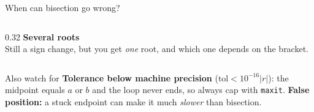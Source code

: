 \documentclass[aspectratio=169]{beamer}
\begin{document}
\begin{frame}{When can bisection go wrong?}
\begin{columns}[T]
\begin{column}{0.32\textwidth}
\textbf{Several roots}\\[2pt]
\scriptsize Still a sign change, but you get \emph{one} root, and which one depends on the bracket.
\end{column}
\end{columns}
\vspace{0.15cm}
\begin{alertblock}{Also watch for}
\scriptsize
\textbf{Tolerance below machine precision} ($\text{tol} < 10^{-16}|r|$): the midpoint equals $a$ or $b$ and the loop never ends, so always cap with \texttt{maxit}. \quad
\textbf{False position:} a stuck endpoint can make it much \emph{slower} than bisection.
\end{alertblock}
\end{frame}

\end{document}
